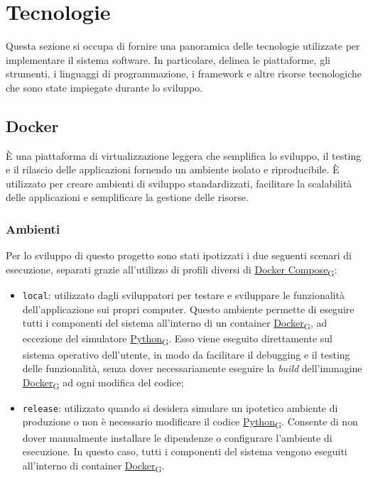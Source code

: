 \section{Tecnologie}
Questa sezione si occupa di fornire una panoramica delle tecnologie utilizzate per implementare il sistema software.
In particolare, delinea le piattaforme, gli strumenti, i linguaggi di programmazione, i framework e altre risorse tecnologiche che sono state impiegate durante lo sviluppo.

\subsection{Docker}
È una piattaforma di virtualizzazione leggera che semplifica lo sviluppo, il testing e il rilascio delle applicazioni fornendo un ambiente isolato e riproducibile.
È utilizzato per creare ambienti di sviluppo standardizzati, facilitare la scalabilità delle applicazioni e semplificare la gestione delle risorse.

\subsubsection{Ambienti}
Per lo sviluppo di questo progetto sono stati ipotizzati i due seguenti scenari di esecuzione, separati grazie all'utilizzo di profili diversi di \href{https://7last.github.io/docs/pb/documentazione-interna/glossario\#docker-compose}{Docker Compose\textsubscript{G}}:
\begin{itemize}
	\item \texttt{local}: utilizzato dagli sviluppatori per testare e sviluppare le funzionalità dell'applicazione sui propri computer.
	      Questo ambiente permette di eseguire tutti i componenti del sistema all'interno di un container \href{https://7last.github.io/docs/pb/documentazione-interna/glossario\#docker}{Docker\textsubscript{G}}, ad eccezione del simulatore \href{https://7last.github.io/docs/pb/documentazione-interna/glossario\#python}{Python\textsubscript{G}}.
	      Esso viene eseguito direttamente sul sistema operativo dell'utente, in modo da facilitare il debugging e il testing delle funzionalità,
	      senza dover necessariamente eseguire la \textit{build} dell'immagine \href{https://7last.github.io/docs/pb/documentazione-interna/glossario\#docker}{Docker\textsubscript{G}} ad ogni modifica del codice;
	\item \texttt{release}: utilizzato quando si desidera simulare un ipotetico ambiente di produzione o non è necessario modificare il codice \href{https://7last.github.io/docs/pb/documentazione-interna/glossario\#python}{Python\textsubscript{G}}. Consente di non dover manualmente
	      installare le dipendenze o configurare l'ambiente di esecuzione. In questo caso, tutti i componenti del sistema vengono eseguiti all'interno di container \href{https://7last.github.io/docs/pb/documentazione-interna/glossario\#docker}{Docker\textsubscript{G}}.

\end{itemize}


